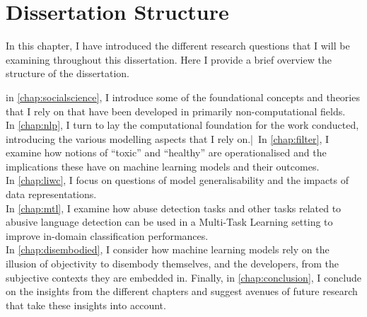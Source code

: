 \section{Dissertation Structure}\label{sec:structure}

In this chapter, I have introduced the different research questions that I will be examining throughout this dissertation. Here I provide a brief overview the structure of the dissertation.

in \cref{chap:socialscience}, I introduce some of the foundational concepts and theories that I rely on that have been developed in primarily non-computational fields.\\
In \cref{chap:nlp}, I turn to lay the computational foundation for the work conducted, introducing the various modelling aspects that I rely on.|\
In \cref{chap:filter}, I examine how notions of ``toxic'' and ``healthy'' are operationalised and the implications these have on machine learning models and their outcomes.\\
In \cref{chap:liwc}, I focus on questions of model generalisability and the impacts of data representations.\\
In \cref{chap:mtl}, I examine how abuse detection tasks and other tasks related to abusive language detection can be used in a Multi-Task Learning setting to improve in-domain classification performances.\\
In \cref{chap:disembodied}, I consider how machine learning models rely on the illusion of objectivity to disembody themselves, and the developers, from the subjective contexts they are embedded in.
Finally, in \cref{chap:conclusion}, I conclude on the insights from the different chapters and suggest avenues of future research that take these insights into account.



